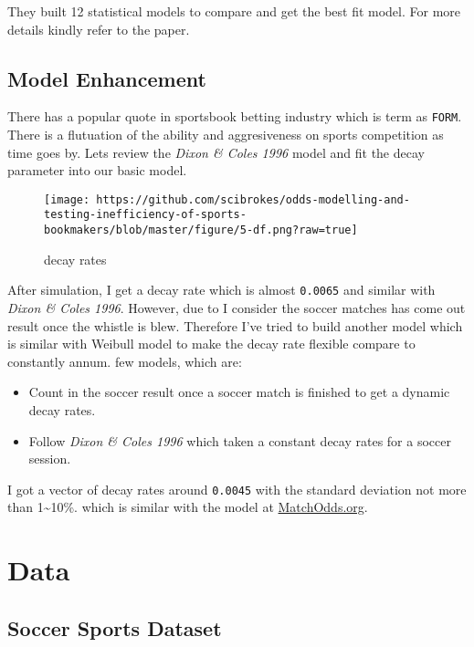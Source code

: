 \documentclass[article]{jss}
\providecommand{\tightlist}{%
  \setlength{\itemsep}{0pt}\setlength{\parskip}{0pt}}
\begin{document}
They built 12 statistical models to compare and get the best fit model.
For more details kindly refer to the paper.

\hypertarget{model-enhancement}{\subsection{Model
Enhancement}\label{model-enhancement}}

There has a popular quote in sportsbook betting industry which is term
as \texttt{FORM}. There is a flutuation of the ability and aggresiveness
on sports competition as time goes by. Lets review the \emph{Dixon \&
Coles 1996} model and fit the decay parameter into our basic model.
\bigbreak

\begin{figure}[htbp]
\centering
\texttt{[image: https://github.com/scibrokes/odds-modelling-and-testing-inefficiency-of-sports-bookmakers/blob/master/figure/5-df.png?raw=true]}
\caption{decay rates}
\end{figure}

After simulation, I get a decay rate which is almost \texttt{0.0065} and
similar with \emph{Dixon \& Coles 1996}. However, due to I consider the
soccer matches has come out result once the whistle is blew. Therefore
I've tried to build another model which is similar with Weibull model to
make the decay rate flexible compare to constantly annum. few models,
which are:

\begin{itemize}
\tightlist
\item
  Count in the soccer result once a soccer match is finished to get a
  dynamic decay rates.
\item
  Follow \emph{Dixon \& Coles 1996} which taken a constant decay rates
  for a soccer session.
\end{itemize}

I got a vector of decay rates around \texttt{0.0045} with the standard
deviation not more than 1\textasciitilde{}10\%. which is similar with
the model at \href{http://matchodds.org}{MatchOdds.org}.

\section{Data}\label{data}

\subsection{Soccer Sports Dataset}\label{soccer-sports-dataset}
\end{document}
